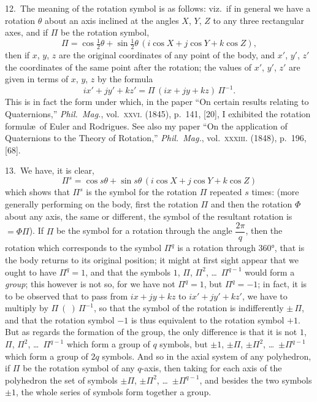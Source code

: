 \documentclass[11pt,a4paper]{article}
\begin{document}
12.~The meaning of the rotation symbol is as follows: viz.~if in general we have a rotation $\theta$ about an axis inclined at the angles $X$, $Y$, $Z$ to any three rectangular axes, and if $\Pi$ be the rotation symbol,
\[
\Pi = \cos \tfrac{1}{2}\theta + \sin \tfrac{1}{2}\theta\,(i\cos X + j\cos Y + k\cos Z),
\]
then if $x$, $y$, $z$ are the original coordinates of any point of the body, and $x'$, $y'$, $z'$ the coordinates of the same point after the rotation; the values of $x'$, $y'$, $z'$ are given in terms of $x$, $y$, $z$ by the formula
\[
ix' + jy' + kz' = \Pi\,(ix + jy + kz)\,\Pi^{-1}.
\]
This is in fact the form under which, in the paper ``On certain results relating to Quaternions,'' \textit{Phil.\ Mag.}, vol.~\textsc{xxvi}. (1845), p.~141, [20], I exhibited the rotation formul\ae\ of Euler and Rodrigues. See also my paper ``On the application of Quaternions to the Theory of Rotation,'' \textit{Phil.\ Mag.}, vol.~\textsc{xxxiii}. (1848), p.~196, [68].

13.~We have, it is clear,
\[
\Pi^{s} = \cos s\theta + \sin s\theta\,(i\cos X + j\cos Y + k\cos Z)
\]
which shows that $\Pi^{s}$ is the symbol for the rotation $\Pi$ repeated $s$ times: (more generally performing on the body, first the rotation $\Pi$ and then the rotation $\Phi$ about any axis, the same or different, the symbol of the resultant rotation is $= \Phi\Pi$). If $\Pi$ be the symbol for a rotation through the angle $\dfrac{2\pi}{q}$, then the rotation which corresponds to the symbol $\Pi^{q}$ is a rotation through $360°$, that is the body returns to its original position; it might at first sight appear that we ought to have $\Pi^{q} = 1$, and that the symbols $1$, $\Pi$, $\Pi^{2}$, \ldots\ $\Pi^{q-1}$ would form a \textit{group}; this however is not so, for we have not $\Pi^{q} = 1$, but $\Pi^{q} = -1$; in fact, it is to be observed that to pass from $ix + jy + kz$ to $ix' + jy' + kz'$, we have to multiply by $\Pi\ (\ )\,\Pi^{-1}$, so that the symbol of the rotation is indifferently $\pm\,\Pi$, and that the rotation symbol $-1$ is thus equivalent to the rotation symbol $+1$. But as regards the formation of the group, the only difference is that it is not $1$, $\Pi$, $\Pi^{2}$, \ldots\ $\Pi^{q-1}$ which form a group of $q$ symbols, but $\pm 1$, $\pm\Pi$, $\pm\Pi^{2}$, \ldots\ $\pm\Pi^{q-1}$ which form a group of $2q$ symbols. And so in the axial system of any polyhedron, if $\Pi$ be the rotation symbol of any $q$-axis, then taking for each axis of the polyhedron the set of symbols $\pm\Pi$, $\pm\Pi^{2}$, \ldots\ $\pm\Pi^{q-1}$, and besides the two symbols $\pm 1$, the whole series of symbols form together a group.
\end{document}
